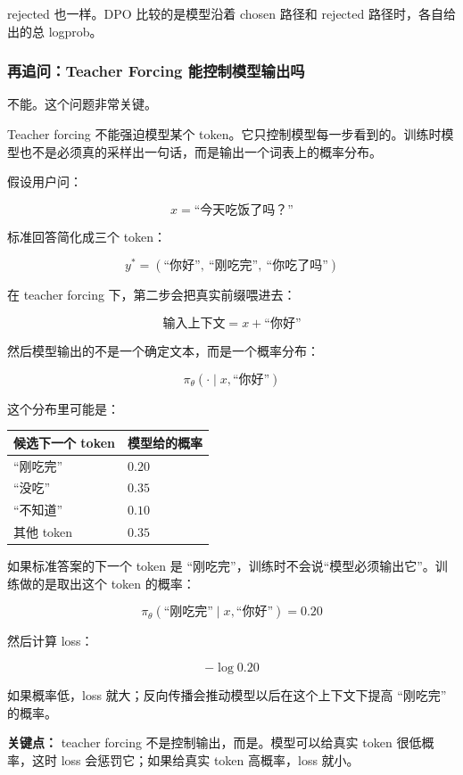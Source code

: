 rejected 也一样。DPO 比较的是模型沿着 chosen 路径和 rejected 路径时，各自给出的总 logprob。

\subsubsection{再追问：Teacher Forcing 能控制模型输出吗}

不能。这个问题非常关键。

Teacher forcing 不能强迫模型某个 token。它只控制模型每一步看到的。训练时模型也不是必须真的采样出一句话，而是输出一个词表上的概率分布。

假设用户问：

\[
x = \text{``今天吃饭了吗？''}
\]

标准回答简化成三个 token：

\[
y^\ast = (\text{``你好''},\ \text{``刚吃完''},\ \text{``你吃了吗''})
\]

在 teacher forcing 下，第二步会把真实前缀喂进去：

\[
\text{输入上下文} = x + \text{``你好''}
\]

然后模型输出的不是一个确定文本，而是一个概率分布：

\[
\pi_\theta(\cdot \mid x, \text{``你好''})
\]

这个分布里可能是：

\begin{center}
{\small
\begin{tabular}{p{4cm}p{4cm}}
\hline
\textbf{候选下一个 token} & \textbf{模型给的概率} \\
\hline
``刚吃完'' & $0.20$ \\
``没吃'' & $0.35$ \\
``不知道'' & $0.10$ \\
其他 token & $0.35$ \\
\hline
\end{tabular}
}
\end{center}

如果标准答案的下一个 token 是 ``刚吃完''，训练时不会说“模型必须输出它”。训练做的是取出这个 token 的概率：

\[
\pi_\theta(\text{``刚吃完''} \mid x, \text{``你好''}) = 0.20
\]

然后计算 loss：

\[
-\log 0.20
\]

如果概率低，loss 就大；反向传播会推动模型以后在这个上下文下提高 ``刚吃完'' 的概率。

\begin{warnbox}
\textbf{关键点：} teacher forcing 不是控制输出，而是。模型可以给真实 token 很低概率，这时 loss 会惩罚它；如果给真实 token 高概率，loss 就小。
\end{warnbox}

